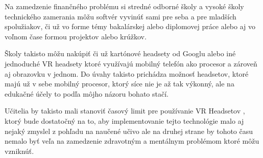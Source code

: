\par \qquad Na zamedzenie finančného problému si stredné odborné školy a vysoké školy 
technického zamerania môžu softvér vyvinúť sami pre 
seba a pre mladších spolužiakov, či už vo forme témy bakalárskej alebo diplomovej práce
alebo aj vo voľnom čase formou projektov alebo krúžkov. 
\par Školy takisto môžu nakúpiť či 
už kartónové headsety od 
Googlu alebo iné jednoduché VR headsety ktoré využívajú mobilný telefón ako procesor a 
zároveň aj obrazovku v jednom. Do úvahy takisto prichádza možnosť headsetov, 
ktoré majú už v sebe mobilný procesor, ktorý síce nie 
je až tak výkonný, ale na edukačné účely to podľa môjho názoru bohato stačí.
\par Učitelia by takisto mali stanoviť časový limit pre používanie VR Headsetov 
, ktorý bude dostatočný na to, aby implementovanie tejto technológie
malo aj nejaký zmyslel z pohľadu na naučené učivo ale na druhej strane by tohoto času 
nemalo byť veľa na zamedzenie zdravotným a mentálnym problémom ktoré môžu vzniknúť.

